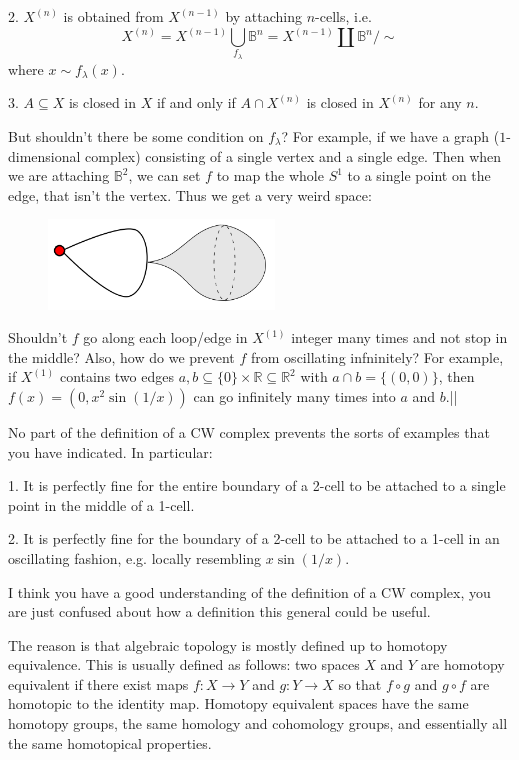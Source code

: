 2. $X^{(n)}$ is obtained from $X^{(n-1)}$ by attaching $n$-cells, i.e.
\[X^{(n)}= X^{(n-1)}\bigcup_{f_{\lambda}}\mathbb{B}^n= X^{(n-1)}\coprod \mathbb{B}^n/\sim\]
where $x\sim f_\lambda(x)$.

3. $A\subseteq X$ is closed in $X$ if and only if $A\cap X^{(n)}$ is closed in $X^{(n)}$ for any $n$.

But shouldn't there be some condition on $f_\lambda$? For example, if we have a graph ($1$-dimensional complex) consisting of a single vertex and a single edge. Then when we are attaching $\mathbb{B}^2$, we can set $f$ to map the whole $S^1$ to a single point on the edge, that isn't the vertex. Thus we get a very weird space:
\begin{figure}[h!]
\centering
\includegraphics[width=6cm]{hulu.png}
\end{figure}

Shouldn't $f$ go along each loop/edge in $X^{(1)}$ integer many times and not stop in the middle? Also, how do we prevent $f$ from oscillating infninitely? For example, if $X^{(1)}$ contains two edges $a,b\subseteq\{0\}\times\mathbb{R}\subseteq\mathbb{R}^2$ with $a\cap b=\{(0,0)\}$, then $f(x)=(0,x^2\sin(1/x))$ can go infinitely many times into $a$ and $b$.\hfill || \par



No part of the definition of a CW complex prevents the sorts of examples that you have indicated.  In particular:

1. It is perfectly fine for the entire boundary of a 2-cell to be attached to a single point in the middle of a 1-cell.

2. It is perfectly fine for the boundary of a 2-cell to be attached to a 1-cell in an oscillating fashion, e.g. locally resembling $x \sin(1/x)$.\par

I think you have a good understanding of the definition of a CW complex, you are just confused about how a definition this general could be useful.\par

The reason is that algebraic topology is mostly defined up to homotopy equivalence. This is usually defined as follows: two spaces $X$ and $Y$ are homotopy equivalent if there exist maps $f\colon X\to Y$ and $g\colon Y \to X$ so that $f\circ g$ and $g\circ f$ are homotopic to the identity map.  Homotopy equivalent spaces have the same homotopy groups, the same homology and cohomology groups, and essentially all the same homotopical properties.\par

